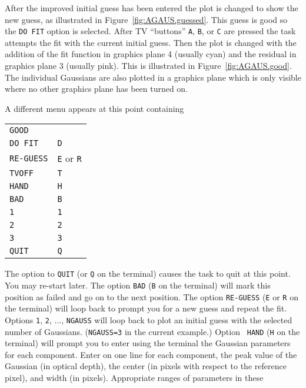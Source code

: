 \documentclass[twoside]{article}
\begin{document}
After the improved initial guess has been entered the plot is changed
to show the new guess, as illustrated in Figure~\ref{fig:AGAUS.guessed}.
This guess is good so the {\tt DO FIT} option is selected.  After TV
``buttons'' {\tt A}, {\tt B}, or {\tt C} are pressed the task attempts
the fit with the current initial guess.  Then the plot is changed with
the addition of the fit function in graphics plane 4 (usually cyan)
and the residual in graphics plane 3 (usually pink).  This is
illustrated in Figure~\ref{fig:AGAUS.good}.  The individual Gaussians
are also plotted in a graphics plane which is only visible where no
other graphics plane has been turned on.

A different menu appears at this point containing\\
\begin{center}
\begin{tabular}{|l|l|}\hline
   {\tt GOOD}     & {\tt \hphantom{A}} \\
   {\tt DO FIT}   & {\tt D} \\
   {\tt RE-GUESS} & {\tt E} or {\tt R} \\
   {\tt TVOFF}    & {\tt T} \\
   {\tt HAND}     & {\tt H} \\
   {\tt BAD}      & {\tt B} \\
   {\tt 1}        & {\tt 1} \\
   {\tt 2}        & {\tt 2} \\
   {\tt 3}        & {\tt 3} \\
   {\tt QUIT}     & {\tt Q} \\ \hline
\end{tabular}
\end{center}
The option to {\tt QUIT} (or {\tt Q} on the terminal) causes the task
to quit at this point.  You may re-start later.  The option {\tt BAD}
({\tt B} on the terminal) will mark this position as failed and go on
to the next position.   The option {\tt RE-GUESS} ({\tt E} or {\tt R}
on the terminal) will loop back to prompt you for a new guess and
repeat the fit.  Options {\tt 1}, {\tt 2}, $\ldots$, {\tt NGAUSS} will
loop back to plot an initial guess with the selected number of
Gaussians.  ({\tt NGAUSS=3} in the current example.)  Option {\tt
  HAND} ({\tt H} on the terminal) will prompt you to enter using the
terminal the Gaussian parameters for each component.  Enter on one
line for each component, the peak value of the Gaussian (in optical
depth), the center (in pixels with respect to the reference pixel),
and width (in pixels).  Appropriate ranges of parameters in these
\end{document}
